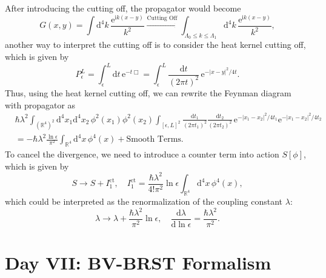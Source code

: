 \documentclass[10pt]{article}
\begin{document}
After introducing the cutting off, the propagator would become
\begin{equation*}
  G(x,y) = \int \mathrm{d} ^{4} k \, \frac{\mathrm{e}^{\mathrm{i}k(x-y)}}{k^{2}} \xrightarrow{\text{Cutting Off}} \int _{\Lambda_{0} \le k \le \Lambda_1} \mathrm{d} ^{4} k \, \frac{\mathrm{e}^{\mathrm{i}k(x-y)}}{k^{2}},
\end{equation*}
another way to interpret the cutting off is to consider the heat kernel cutting off, which is given by
\begin{equation*}
  P^{L}_{\epsilon}= \int _{\epsilon}^{L} \mathrm{d} t \, \mathrm{e}^{-t\Box} = \int _{\epsilon}^{L} \frac{\mathrm{d} t}{(2 \pi t)^{2}} \, \mathrm{e}^{- \left| x-y \right|^{2} / 4t}.
\end{equation*}
Thus, using the heat kernel cutting off, we can rewrite the Feynman diagram with propagator as
\begin{equation*}
  \begin{aligned}
    & \hbar \lambda^{2} \int _{(\mathbb{R}^{4})^{2}} \mathrm{d} ^{4} x_1 \mathrm{d} ^{4} x_2 \, \phi^{2}(x_1) \phi^{2}(x_2) \int _{[\epsilon, L]^{2}} \frac{\mathrm{d} t_1}{(2\pi t_1)^{2}} \frac{\mathrm{d} t_2}{(2\pi t_2)^{2}} \, \mathrm{e}^{- \left| x_1 - x_2 \right|^{2} / 4t_1} \mathrm{e}^{- \left| x_1 - x_2 \right|^{2} / 4t_2} \\
    & = - \hbar \lambda^{2} \frac{\ln \epsilon}{\pi^{2}} \int _{\mathbb{R}^{4}} \mathrm{d} ^{4} x \, \phi^{4}(x) + \text{Smooth Terms}.
  \end{aligned}
\end{equation*}
To cancel the divergence, we need to introduce a counter term into action $ S[\phi]$, which is given by
\begin{equation*}
  S \rightarrow S + I_{1}^{\mathrm{ct}}, \quad
  I_{1}^{\mathrm{ct}} = \frac{\hbar \lambda^{2}}{4! \pi^{2}} \ln \epsilon \int _{\mathbb{R}^{4}} \mathrm{d} ^{4} x \, \phi^{4}(x),
\end{equation*}
which could be interpreted as the renormalization of the coupling constant $ \lambda$:
\begin{equation*}
  \lambda \rightarrow \lambda + \frac{\hbar \lambda^{2}}{\pi^{2}} \ln \epsilon, \quad \frac{\mathrm{d} \lambda}{\mathrm{d} \ln \epsilon} = \frac{\hbar \lambda^{2}}{\pi^{2}}.
\end{equation*}

\section{Day VII: BV-BRST Formalism}
\end{document}
